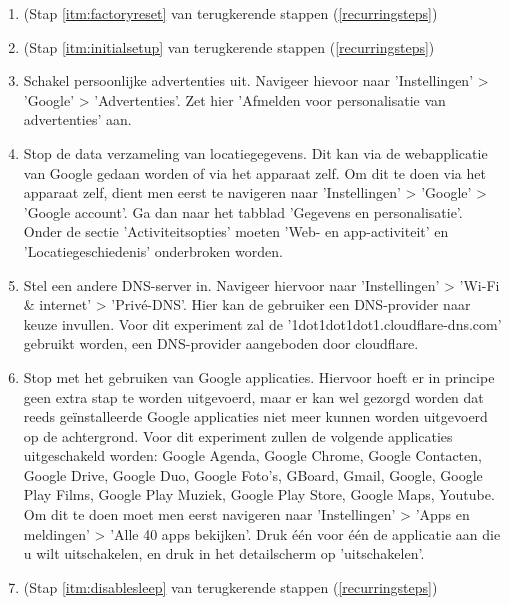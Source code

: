 \begin{enumerate}
    \item 
     (Stap \ref{itm:factoryreset} van terugkerende stappen (\ref{recurringsteps})
    
    \item 
     (Stap \ref{itm:initialsetup} van terugkerende stappen (\ref{recurringsteps})
    
    \item Schakel persoonlijke advertenties uit. Navigeer hievoor naar 'Instellingen' > 'Google' > 'Advertenties'. Zet hier 'Afmelden voor personalisatie van advertenties' aan.
    
    \item Stop de data verzameling van locatiegegevens. Dit kan via de webapplicatie van Google gedaan worden of via het apparaat zelf. Om dit te doen via het apparaat zelf, dient men eerst te navigeren naar 'Instellingen' > 'Google' > 'Google account'. Ga dan naar het tabblad 'Gegevens en personalisatie'. Onder de sectie 'Activiteitsopties' moeten 'Web- en app-activiteit' en 'Locatiegeschiedenis' onderbroken worden.
    
    \item Stel een andere DNS-server in. Navigeer hiervoor naar 'Instellingen' > 'Wi-Fi \& internet' > 'Privé-DNS'. Hier kan de gebruiker een DNS-provider naar keuze invullen. Voor dit experiment zal de '1dot1dot1dot1.cloudflare-dns.com' gebruikt worden, een DNS-provider aangeboden door cloudflare.
    
    \item Stop met het gebruiken van Google applicaties. Hiervoor hoeft er in principe geen extra stap te worden uitgevoerd, maar er kan wel gezorgd worden dat reeds geïnstalleerde Google applicaties niet meer kunnen worden uitgevoerd op de achtergrond. Voor dit experiment zullen de volgende applicaties uitgeschakeld worden: Google Agenda, Google Chrome, Google Contacten, Google Drive, Google Duo, Google Foto's, GBoard, Gmail, Google, Google Play Films, Google Play Muziek, Google Play Store, Google Maps, Youtube. Om dit te doen moet men eerst navigeren naar 'Instellingen' > 'Apps en meldingen' > 'Alle 40 apps bekijken'. Druk één voor één de applicatie aan die u wilt uitschakelen, en druk in het detailscherm op 'uitschakelen'.
    
    \item 
     (Stap \ref{itm:disablesleep} van terugkerende stappen (\ref{recurringsteps})
\end{enumerate}
    
